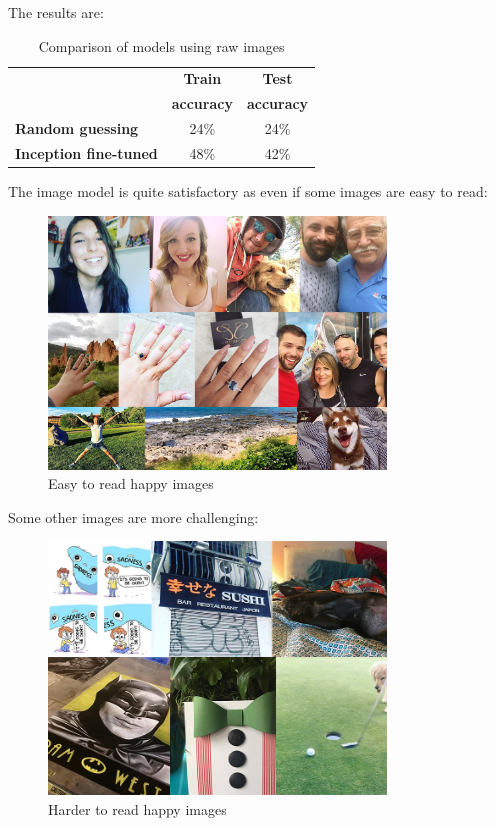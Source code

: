 The results are:
\begin{table}[H]
\begin{center}
    \begin{tabular}{| l | c | c |}
    \hline
    & \textbf{Train} & \textbf{Test} \\
    & \textbf{accuracy} & \textbf{accuracy} \\ \hline
    \textbf{Random guessing} & 24\% & 24\% \\ \hline
    \textbf{Inception fine-tuned}  & 48\% & 42\% \\
    \hline
    \end{tabular}
\end{center} 
\caption{Comparison of models using raw images}
\end{table}

The image model is quite satisfactory as even if some images are easy to read:

\begin{figure}[H]
    \centering
    \includegraphics[width=0.8\textwidth]{Images/happy_easy.jpg}
    \caption{Easy to read happy images}
\end{figure}

Some other images are more challenging:

\begin{figure}[H]
    \centering
    \includegraphics[width=0.8\textwidth]{Images/happy_hard.jpg}
    \caption{Harder to read happy images}
\end{figure}




